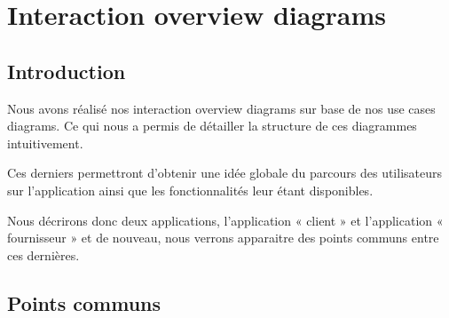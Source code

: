 \section{Interaction overview diagrams}

\subsection{Introduction}

\begin{flushleft}
Nous avons réalisé nos interaction overview diagrams sur base de nos use cases diagrams. 
Ce qui nous a permis de détailler la structure de ces diagrammes intuitivement.
\end{flushleft}

\begin{flushleft}
Ces derniers permettront d’obtenir une idée globale du parcours des utilisateurs sur l’application ainsi que les fonctionnalités leur étant disponibles.
\end{flushleft}

\begin{flushleft}
Nous décrirons donc deux applications, l’application « client » et l’application « fournisseur » et de nouveau, nous verrons apparaitre des points communs entre ces dernières.
\end{flushleft}

\newpage
\subsection{Points communs}

